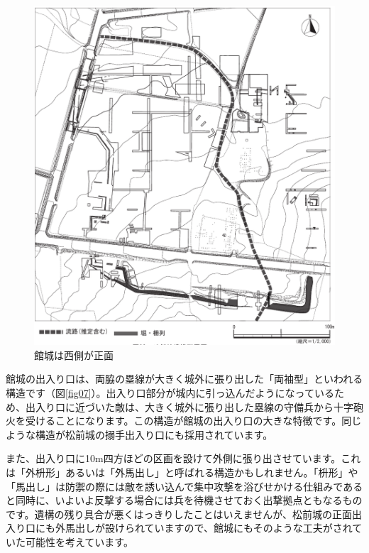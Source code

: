 \documentclass[11pt,report]{jsbook}
\begin{document}
\begin{figure}[h]
\centering
\includegraphics[width=160truemm]{fig/06.pdf}
\caption{館城は西側が正面}
\label{fig06}
\end{figure}

館城の出入り口は、両脇の塁線が大きく城外に張り出した「両袖型」といわれる構造です（図\ref{fig07}）。出入り口部分が城内に引っ込んだようになっているため、出入り口に近づいた敵は、大きく城外に張り出した塁線の守備兵から十字砲火を受けることになります。この構造が館城の出入り口の大きな特徴です。同じような構造が松前城の搦手出入り口にも採用されています。

また、出入り口に10m四方ほどの区画を設けて外側に張り出させています。これは「外枡形」あるいは「外馬出し」と呼ばれる構造かもしれません。「枡形」や「馬出し」は防禦の際には敵を誘い込んで集中攻撃を浴びせかける仕組みであると同時に、いよいよ反撃する場合には兵を待機させておく出撃拠点ともなるものです。遺構の残り具合が悪くはっきりしたことはいえませんが、松前城の正面出入り口にも外馬出しが設けられていますので、館城にもそのような工夫がされていた可能性を考えています。
\end{document}

